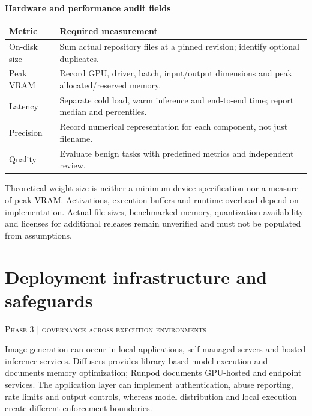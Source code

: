 \documentclass[10pt,a4paper]{article}
\newcommand{\sect}[2]{\Needspace{6\baselineskip}\section{#1}\textcolor{muted}{\small\textsc{#2}}\par\vspace{2mm}}
\newcommand{\sub}[1]{\vspace{1mm}\textbf{#1}\par}
\begin{document}
\sub{Hardware and performance audit fields}

\begin{center}\small\begin{tabularx}{\linewidth}{@{}YY@{}}\toprule
\textbf{Metric} & \textbf{Required measurement}\\\midrule
On-disk size & Sum actual repository files at a pinned revision; identify optional duplicates.\\
Peak VRAM & Record GPU, driver, batch, input/output dimensions and peak allocated/reserved memory.\\
Latency & Separate cold load, warm inference and end-to-end time; report median and percentiles.\\
Precision & Record numerical representation for each component, not just filename.\\
Quality & Evaluate benign tasks with predefined metrics and independent review.\\\bottomrule\end{tabularx}\end{center}

Theoretical weight size is neither a minimum device specification nor a measure of peak VRAM. Activations, execution buffers and runtime overhead depend on implementation. Actual file sizes, benchmarked memory, quantization availability and licenses for additional releases remain unverified and must not be populated from assumptions.


\sect{Deployment infrastructure and safeguards}{Phase 3 | governance across execution environments}

Image generation can occur in local applications, self-managed servers and hosted inference services. Diffusers provides library-based model execution and documents memory optimization; Runpod documents GPU-hosted and endpoint services. The application layer can implement authentication, abuse reporting, rate limits and output controls, whereas model distribution and local execution create different enforcement boundaries. \cite{memory,runpod}
\end{document}
